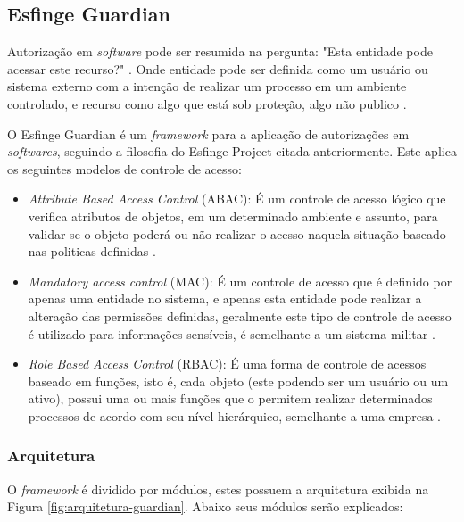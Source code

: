 \subsection{Esfinge Guardian}

\par Autorização em \textit{software} pode ser resumida na pergunta: "Esta entidade pode acessar este recurso?" \cite{sandhu1994access}. Onde entidade pode ser definida como um usuário ou sistema externo com a intenção de realizar um processo em um ambiente controlado, e recurso como algo que está sob proteção, algo não publico \cite{bartsch2011authorization}.
\par O Esfinge Guardian é um \textit{framework} para a aplicação de autorizações em \textit{softwares}, seguindo a filosofia do Esfinge Project citada anteriormente. Este aplica os seguintes modelos de controle de acesso:

\begin{itemize}
    \item \textit{Attribute Based Access Control} (ABAC): É um controle de acesso lógico que verifica atributos de objetos, em um determinado ambiente e assunto, para validar se o objeto poderá ou não realizar o acesso naquela situação baseado nas politicas definidas \cite{hu2015attribute}.
    
    \item \textit{Mandatory access control} (MAC): É um controle de acesso que é definido por apenas uma entidade no sistema, e apenas esta entidade pode realizar a alteração das permissões definidas, geralmente este tipo de controle de acesso é utilizado para informações sensíveis, é semelhante a um sistema militar \cite{lindqvist2006mandatory}.
    \item \textit{Role Based Access Control} (RBAC): É uma forma de controle de acessos baseado em funções, isto é, cada objeto (este podendo ser um usuário ou um ativo), possui uma ou mais funções que o permitem realizar determinados processos de acordo com seu nível hierárquico, semelhante a uma empresa \cite{sandhu2000nist}.
\end{itemize}

\subsubsection{Arquitetura}

\par O \textit{framework} é dividido por módulos, estes possuem a arquitetura exibida na Figura \ref{fig:arquitetura-guardian}. Abaixo seus módulos serão explicados:

